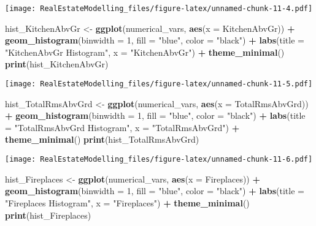 \documentclass[
]{article}
\newenvironment{Shaded}{\begin{snugshade}}{\end{snugshade}}
\newcommand{\AttributeTok}[1]{\textcolor[rgb]{0.13,0.29,0.53}{#1}}
\newcommand{\DecValTok}[1]{\textcolor[rgb]{0.00,0.00,0.81}{#1}}
\newcommand{\FunctionTok}[1]{\textcolor[rgb]{0.13,0.29,0.53}{\textbf{#1}}}
\newcommand{\NormalTok}[1]{#1}
\newcommand{\OtherTok}[1]{\textcolor[rgb]{0.56,0.35,0.01}{#1}}
\newcommand{\SpecialCharTok}[1]{\textcolor[rgb]{0.81,0.36,0.00}{\textbf{#1}}}
\newcommand{\StringTok}[1]{\textcolor[rgb]{0.31,0.60,0.02}{#1}}
\begin{document}
\texttt{[image: RealEstateModelling\_files/figure-latex/unnamed-chunk-11-4.pdf]}

\begin{Shaded}
\begin{Highlighting}[]
\NormalTok{hist\_KitchenAbvGr }\OtherTok{\textless{}{-}} \FunctionTok{ggplot}\NormalTok{(numerical\_vars, }\FunctionTok{aes}\NormalTok{(}\AttributeTok{x =}\NormalTok{ KitchenAbvGr)) }\SpecialCharTok{+}
  \FunctionTok{geom\_histogram}\NormalTok{(}\AttributeTok{binwidth =} \DecValTok{1}\NormalTok{, }\AttributeTok{fill =} \StringTok{"blue"}\NormalTok{, }\AttributeTok{color =} \StringTok{"black"}\NormalTok{) }\SpecialCharTok{+}
  \FunctionTok{labs}\NormalTok{(}\AttributeTok{title =} \StringTok{"KitchenAbvGr Histogram"}\NormalTok{, }\AttributeTok{x =} \StringTok{"KitchenAbvGr"}\NormalTok{) }\SpecialCharTok{+}
  \FunctionTok{theme\_minimal}\NormalTok{()}
\FunctionTok{print}\NormalTok{(hist\_KitchenAbvGr)}
\end{Highlighting}
\end{Shaded}

\texttt{[image: RealEstateModelling\_files/figure-latex/unnamed-chunk-11-5.pdf]}

\begin{Shaded}
\begin{Highlighting}[]
\NormalTok{hist\_TotalRmsAbvGrd }\OtherTok{\textless{}{-}} \FunctionTok{ggplot}\NormalTok{(numerical\_vars, }\FunctionTok{aes}\NormalTok{(}\AttributeTok{x =}\NormalTok{ TotalRmsAbvGrd)) }\SpecialCharTok{+}
  \FunctionTok{geom\_histogram}\NormalTok{(}\AttributeTok{binwidth =} \DecValTok{1}\NormalTok{, }\AttributeTok{fill =} \StringTok{"blue"}\NormalTok{, }\AttributeTok{color =} \StringTok{"black"}\NormalTok{) }\SpecialCharTok{+}
  \FunctionTok{labs}\NormalTok{(}\AttributeTok{title =} \StringTok{"TotalRmsAbvGrd Histogram"}\NormalTok{, }\AttributeTok{x =} \StringTok{"TotalRmsAbvGrd"}\NormalTok{) }\SpecialCharTok{+}
  \FunctionTok{theme\_minimal}\NormalTok{()}
\FunctionTok{print}\NormalTok{(hist\_TotalRmsAbvGrd)}
\end{Highlighting}
\end{Shaded}

\texttt{[image: RealEstateModelling\_files/figure-latex/unnamed-chunk-11-6.pdf]}

\begin{Shaded}
\begin{Highlighting}[]
\NormalTok{hist\_Fireplaces }\OtherTok{\textless{}{-}} \FunctionTok{ggplot}\NormalTok{(numerical\_vars, }\FunctionTok{aes}\NormalTok{(}\AttributeTok{x =}\NormalTok{ Fireplaces)) }\SpecialCharTok{+}
  \FunctionTok{geom\_histogram}\NormalTok{(}\AttributeTok{binwidth =} \DecValTok{1}\NormalTok{, }\AttributeTok{fill =} \StringTok{"blue"}\NormalTok{, }\AttributeTok{color =} \StringTok{"black"}\NormalTok{) }\SpecialCharTok{+}
  \FunctionTok{labs}\NormalTok{(}\AttributeTok{title =} \StringTok{"Fireplaces Histogram"}\NormalTok{, }\AttributeTok{x =} \StringTok{"Fireplaces"}\NormalTok{) }\SpecialCharTok{+}
  \FunctionTok{theme\_minimal}\NormalTok{()}
\FunctionTok{print}\NormalTok{(hist\_Fireplaces)}
\end{Highlighting}
\end{Shaded}
\end{document}
